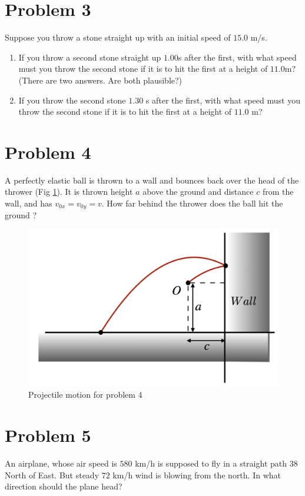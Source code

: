\documentclass[12pt]{article}
\begin{document}
  \section*{Problem 3}
Suppose you throw a stone straight up with an initial speed of $15.0$ m/s.
\begin{enumerate}[label=$\roman*$)]
\item If you throw a second stone straight up $1.00$s after the first, with what speed must you throw the second stone if it is to hit the first at a height of $11.0 $m? (There are two answers. Are both plausible?)
\item If you throw the second stone $1.30$ s after the first, with what speed must you throw the second stone if it is to hit the first at a height of $11.0$ m?
\end{enumerate}

  \section*{Problem 4}
A perfectly elastic ball is thrown to a wall and bounces back over the head of the thrower (Fig \ref{fig2}). It is thrown height $a$ above the ground and distance $c$ from the wall, and has $v_{0x}=v_{0y}=v$. How far behind the thrower does the ball hit the ground ?
\begin{figure}
\center
\includegraphics[scale=0.4]{projectile}
\caption{Projectile motion for problem 4}\label{fig2}
\end{figure}
 \section*{Problem 5}
An airplane, whose air speed is $580$ km/h is supposed to fly in a straight path $38$ North of East. But steady $72$ km/h wind is blowing from the north. In what direction should the plane head?
\end{document}
